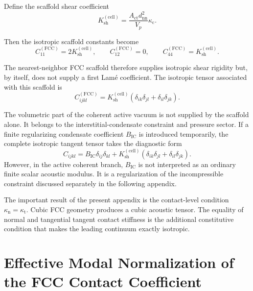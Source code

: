 Define the scaffold shear coefficient
\begin{equation}
    K_{\mathrm{sh}}^{(\mathrm{cell})} = \frac{A_{\mathrm{ct}}d_{\mathrm{nn}}^2}{V_p} \kappa_{\mathrm{c}}.
\end{equation}

Then the isotropic scaffold constants become
\begin{equation}
    C_{11}^{(\mathrm{FCC})} = 2K_{\mathrm{sh}}^{(\mathrm{cell})}, \qquad C_{12}^{(\mathrm{FCC})}=0, \qquad C_{44}^{(\mathrm{FCC})} = K_{\mathrm{sh}}^{(\mathrm{cell})}.
\end{equation}

The nearest-neighbor FCC scaffold therefore supplies isotropic shear rigidity but, by itself, does not supply a first Lamé coefficient. The isotropic tensor associated with this scaffold is
\begin{equation}
    C_{ijkl}^{(\mathrm{FCC})} = K_{\mathrm{sh}}^{(\mathrm{cell})} (\delta_{ik}\delta_{jl}+\delta_{il}\delta_{jk}).
\end{equation}

The volumetric part of the coherent active vacuum is not supplied by the scaffold alone. It belongs to the interstitial-condensate constraint and pressure sector. If a finite regularizing condensate coefficient $B_{\mathrm{IC}}$ is introduced temporarily, the complete isotropic tangent tensor takes the diagnostic form
\begin{equation}
    C_{ijkl} = B_{\mathrm{IC}}\delta_{ij}\delta_{kl} + K_{\mathrm{sh}}^{(\mathrm{cell})} (\delta_{ik}\delta_{jl}+\delta_{il}\delta_{jk}).
\end{equation}
However, in the active coherent branch, $B_{\mathrm{IC}}$ is not interpreted as an ordinary finite scalar acoustic modulus. It is a regularization of the incompressible constraint discussed separately in the following appendix.

The important result of the present appendix is the contact-level condition $\kappa_{\mathrm{n}}=\kappa_{\mathrm{t}}$. Cubic FCC geometry produces a cubic acoustic tensor. The equality of normal and tangential tangent contact stiffness is the additional constitutive condition that makes the leading continuum exactly isotropic.

\section{Effective Modal Normalization of the FCC Contact Coefficient}


